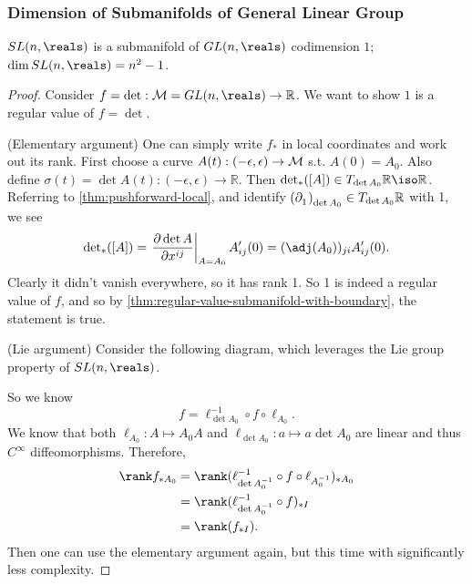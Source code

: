 \documentclass[../main.tex]{subfiles}
\begin{document}
    \subsubsection{Dimension of Submanifolds of General Linear Group}
    \begin{theorem}\label{thm:dim-slnr}
        \(\SPLI{n}{\reals}\) is a submanifold of \(\GL{n}{\reals}\) codimension \(1\); 
        \(\dim \SPLI{n}{\reals} = n^2-1\).
    \end{theorem}
    \begin{proof}
        Consider \(f = \det : \manifold[M]=\GL{n}{\reals} \to \mathbb{R}\). We want to 
        show \(1\) is a regular value of \(f=\det \). \par
        (Elementary argument) One can simply write \(f_*\) in local coordinates 
        and work out its rank. First choose a curve \(A(t) : (-\epsilon, \epsilon)
        \to \manifold[M]\) s.t. \(A(0)=A_0\). Also define \(\sigma(t) = 
        \det A(t) : (-\epsilon, \epsilon) \to \mathbb{R}\).
        Then \({\det}_*([A]) \in T_{\det A_0}\mathbb{R} \iso \mathbb{R}\). 
        Referring to \cref{thm:pushforward-local}, and identify 
        \(\tvec{1}{\det A_0} \in T_{\det A_0}\mathbb{R}\) with 1, we see 
        \[
        {\det }_*([A]) = \left.\frac{\partial \det A}{\partial x^{ij}}
        \right|_{A=A_0}A_{ij}'(0)=(\adj(A_0))_{ji}A_{ij}'(0).
        \]
        Clearly it didn't vanish everywhere, so it has rank 1. So 1 is indeed a 
        regular value of \(f\), and so by 
        \cref{thm:regular-value-submanifold-with-boundary}, the statement is true.
        \par
        (Lie argument) Consider the following diagram, which leverages the Lie 
        group property of \(\SPLI{n}{\reals}\).
        \par
        So we know
        \[
        f = \ell_{\det A_0}^{-1}\circ f\circ \ell_{A_0}.
        \]
        We know that both \(\ell_{A_0} : A \mapsto A_0A\) and \(\ell_{\det A_0}
        : a \mapsto a \det A_0\) are linear and thus 
        \(C^\infty\) diffeomorphisms. Therefore, 
        \[
        \begin{aligned}
            \rank f_{*A_0} &= \rank (\ell_{\det A_0 ^{-1} }^{-1}\circ 
            f\circ \ell_{A_0 ^{-1}})_{*A_0} \\
            &= \rank (\ell_{\det A_0 ^{-1}}^{-1}\circ f)_{*I} \\
            &= \rank (f_{*I}).
        \end{aligned}
        \]
        Then one can use the elementary argument again, but this time with 
        significantly less complexity.
    \end{proof}
\end{document}
